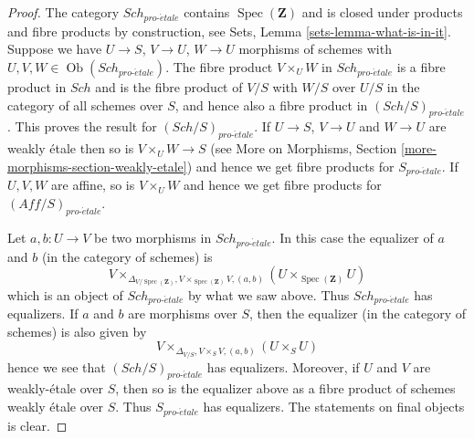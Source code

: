 \documentclass[10pt,a4paper]{amsart}
\theoremstyle{plain}
\theoremstyle{definition}
\theoremstyle{remark}
\numberwithin{equation}{subsection}
\def\Spec{\mathop{\mathrm{Spec}}}
\def\Sch{\mathit{Sch}}
\def\Ob{\mathop{\mathrm{Ob}}\nolimits}
\def\proetale{{pro\text{-}\acute{e}tale}}
\begin{document}
\begin{proof}
The category $\Sch_\proetale$ contains $\Spec(\mathbf{Z})$ and
is closed under products and fibre products by construction, see
Sets, Lemma \ref{sets-lemma-what-is-in-it}.
Suppose we have $U \to S$, $V \to U$, $W \to U$ morphisms
of schemes with $U, V, W \in \Ob(\Sch_\proetale)$.
The fibre product $V \times_U W$ in $\Sch_\proetale$
is a fibre product in $\Sch$ and
is the fibre product of $V/S$ with $W/S$ over $U/S$ in
the category of all schemes over $S$, and hence also a
fibre product in $(\Sch/S)_\proetale$.
This proves the result for $(\Sch/S)_\proetale$.
If $U \to S$, $V \to U$ and $W \to U$ are weakly \'etale then so is
$V \times_U W \to S$ (see
More on Morphisms, Section \ref{more-morphisms-section-weakly-etale})
and hence we get fibre products for $S_\proetale$.
If $U, V, W$ are affine, so is $V \times_U W$ and hence we
get fibre products for $(\textit{Aff}/S)_\proetale$.

\medskip\noindent
Let $a, b : U \to V$ be two morphisms in $\Sch_\proetale$.
In this case the equalizer of $a$ and $b$ (in the category of schemes) is
$$
V
\times_{\Delta_{V/\Spec(\mathbf{Z})}, V \times_{\Spec(\mathbf{Z})} V, (a, b)}
(U \times_{\Spec(\mathbf{Z})} U)
$$
which is an object of $\Sch_\proetale$ by what we saw above.
Thus $\Sch_\proetale$ has equalizers. If $a$ and $b$ are morphisms over $S$,
then the equalizer (in the category of schemes) is also given by
$$
V \times_{\Delta_{V/S}, V \times_S V, (a, b)} (U \times_S U)
$$
hence we see that $(\Sch/S)_\proetale$ has equalizers. Moreover, if
$U$ and $V$ are weakly-\'etale over $S$, then so is the equalizer
above as a fibre product of schemes weakly \'etale over $S$.
Thus $S_\proetale$ has equalizers. The statements on final objects
is clear.
\end{proof}
\end{document}
